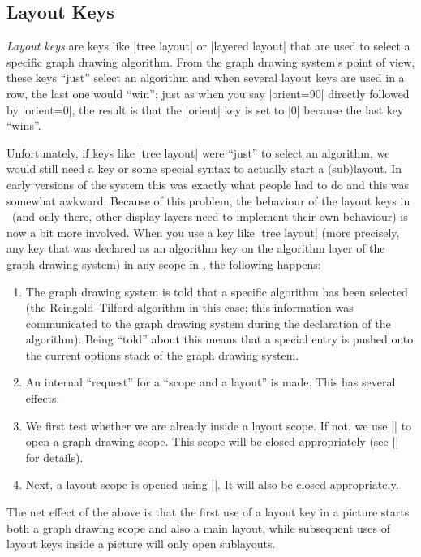 \subsection{Layout Keys}

\emph{Layout keys} are keys like |tree layout| or |layered layout| that are
used to select a specific graph drawing algorithm. From the graph drawing
system's point of view, these keys ``just'' select an algorithm and when
several layout keys are used in a row, the last one would ``win''; just as when
you say |orient=90| directly followed by |orient=0|, the result is that the
|orient| key is set to |0| because the last key ``wins''.

Unfortunately, if keys like |tree layout| were ``just'' to select an algorithm,
we would still need a key or some special syntax to actually start a
(sub)layout. In early versions of the system this was exactly what people had
to do and this was somewhat awkward. Because of this problem, the behaviour of
the layout keys in \pgfname\ (and only there, other display layers need to
implement their own behaviour) is now a bit more involved. When you use a key
like |tree layout| (more precisely, any key that was declared as an algorithm
key on the algorithm layer of the graph drawing system) in any scope in
\pgfname, the following happens:
%
\begin{enumerate}
    \item The graph drawing system is told that a specific algorithm has been
        selected (the Reingold--Tilford-algorithm in this case; this
        information was communicated to the graph drawing system during the
        declaration of the algorithm). Being ``told'' about this means that a
        special entry is pushed onto the current options stack of the graph
        drawing system.
    \item An internal ``request'' for a ``scope and a layout'' is made. This
        has several effects:
    \item We first test whether we are already inside a layout scope. If not,
        we use |\pgfgdbeginscope| to open a graph drawing scope. This scope
        will be closed appropriately (see |\pgfgdsetrequestcallback| for
        details).
    \item Next, a layout scope is opened using |\pgfgdbeginlayout|. It will
        also be closed appropriately.
\end{enumerate}

The net effect of the above is that the first use of a layout key in a picture
starts both a graph drawing scope and also a main layout, while subsequent uses
of layout keys inside a picture will only open sublayouts.

